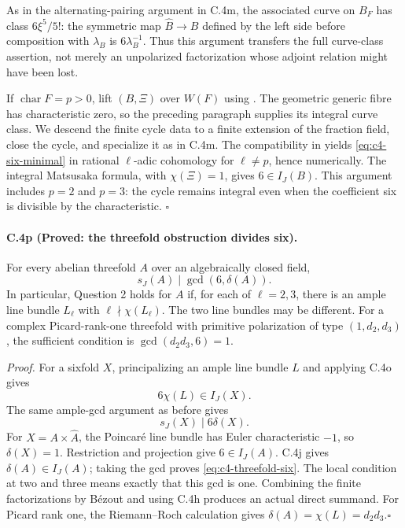 As in the alternating-pairing argument in C.4m, the associated
curve on $B_F$ has class $6\xi^5/5!$: the symmetric map
$\widehat B\to B$ defined by the left side before composition
with $\lambda_B$ is $6\lambda_B^{-1}$. Thus this argument transfers
the full curve-class assertion, not merely an unpolarized
factorization whose adjoint relation might have been lost.

If $\operatorname{char}F=p>0$, lift $(B,\Xi)$ over $W(F)$ using
\citet[Corollary 2.4.2 and its proof, p.~287]{frC4Oort1971}.
The geometric generic fibre has characteristic zero, so the preceding
paragraph supplies its integral curve class. We descend the finite
cycle data to a finite extension of the fraction field, close the
cycle, and specialize it as in C.4m. The compatibility in
\citet[Example 20.3.5, p.~400]{frC4Fulton1998} yields
\eqref{eq:c4-six-minimal} in rational $\ell$-adic cohomology for
$\ell\ne p$, hence numerically. The integral Matsusaka formula,
with $\chi(\Xi)=1$, gives $6\in I_J(B)$.
This argument includes $p=2$ and $p=3$: the cycle remains integral
even when the coefficient six is divisible by the characteristic.
\hfill$\square$

\paragraph{C.4p (Proved: the threefold obstruction divides six).}
For every abelian threefold $A$ over an algebraically closed field,
\begin{equation}\label{eq:c4-threefold-six}
 \boxed{\qquad s_J(A)\mid\gcd(6,\delta(A)).\qquad}
\end{equation}
In particular, Question 2 holds for $A$ if, for each of
$\ell=2,3$, there is an ample line bundle $L_\ell$ with
$\ell\nmid\chi(L_\ell)$. The two line bundles may be different.
For a complex Picard-rank-one threefold with primitive polarization
of type $(1,d_2,d_3)$, the sufficient condition is
$\gcd(d_2d_3,6)=1$.

\emph{Proof.}
For a sixfold $X$, principalizing an ample line bundle $L$ and
applying C.4o gives
\[
                  6\chi(L)\in I_J(X).
\]
The same ample-gcd argument as before gives
\[
                         s_J(X)\mid6\delta(X).
\]
For $X=A\times\widehat A$, the Poincar\'e line bundle has Euler
characteristic $-1$, so $\delta(X)=1$. Restriction and projection
give $6\in I_J(A)$. C.4j gives
$\delta(A)\in I_J(A)$; taking the gcd proves
\eqref{eq:c4-threefold-six}. The local condition at two and three
means exactly that this gcd is one. Combining the finite
factorizations by B\'ezout and using C.4h produces an actual direct
summand. For Picard rank one, the Riemann--Roch calculation gives
$\delta(A)=\chi(L)=d_2d_3$.\hfill$\square$

